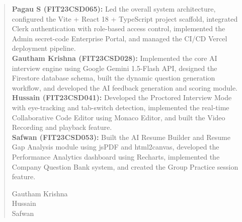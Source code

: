 \newpage
\renewcommand\abstractname{Contribution by Author}
\thispagestyle{plain}
\begin{abstract}
	\vspace{5cm}
	\textbf{Pagau S (FIT23CSD065):} Led the overall system architecture, configured the Vite + React 18 + TypeScript project scaffold, integrated Clerk authentication with role-based access control, implemented the Admin secret-code Enterprise Portal, and managed the CI/CD Vercel deployment pipeline.\\[6pt]
	\textbf{Gautham Krishna (FIT23CSD028):} Implemented the core AI interview engine using Google Gemini 1.5-Flash API, designed the Firestore database schema, built the dynamic question generation workflow, and developed the AI feedback generation and scoring module.\\[6pt]
	\textbf{Hussain (FIT23CSD041):} Developed the Proctored Interview Mode with eye-tracking and tab-switch detection, implemented the real-time Collaborative Code Editor using Monaco Editor, and built the Video Recording and playback feature.\\[6pt]
	\textbf{Safwan (FIT23CSD053):} Built the AI Resume Builder and Resume Gap Analysis module using jsPDF and html2canvas, developed the Performance Analytics dashboard using Recharts, implemented the Company Question Bank system, and created the Group Practice session feature.\\
	\vspace{1cm}
	\begin{flushright}
		Gautham Krishna\\
		Hussain\\
		Safwan
	\end{flushright}
\end{abstract}


